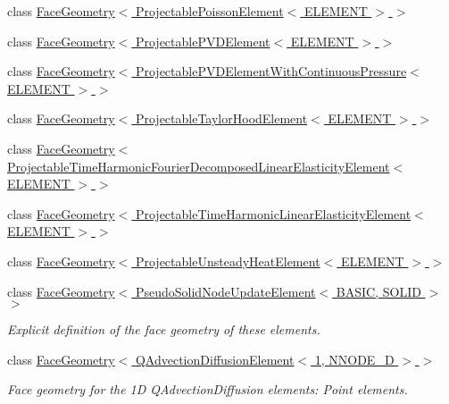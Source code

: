 \begin{DoxyCompactItemize}
\item 
class \hyperlink{classoomph_1_1FaceGeometry_3_01ProjectablePoissonElement_3_01ELEMENT_01_4_01_4}{Face\+Geometry$<$ Projectable\+Poisson\+Element$<$ E\+L\+E\+M\+E\+N\+T $>$ $>$}
\item 
class \hyperlink{classoomph_1_1FaceGeometry_3_01ProjectablePVDElement_3_01ELEMENT_01_4_01_4}{Face\+Geometry$<$ Projectable\+P\+V\+D\+Element$<$ E\+L\+E\+M\+E\+N\+T $>$ $>$}
\item 
class \hyperlink{classoomph_1_1FaceGeometry_3_01ProjectablePVDElementWithContinuousPressure_3_01ELEMENT_01_4_01_4}{Face\+Geometry$<$ Projectable\+P\+V\+D\+Element\+With\+Continuous\+Pressure$<$ E\+L\+E\+M\+E\+N\+T $>$ $>$}
\item 
class \hyperlink{classoomph_1_1FaceGeometry_3_01ProjectableTaylorHoodElement_3_01ELEMENT_01_4_01_4}{Face\+Geometry$<$ Projectable\+Taylor\+Hood\+Element$<$ E\+L\+E\+M\+E\+N\+T $>$ $>$}
\item 
class \hyperlink{classoomph_1_1FaceGeometry_3_01ProjectableTimeHarmonicFourierDecomposedLinearElasticityElement_3_01ELEMENT_01_4_01_4}{Face\+Geometry$<$ Projectable\+Time\+Harmonic\+Fourier\+Decomposed\+Linear\+Elasticity\+Element$<$ E\+L\+E\+M\+E\+N\+T $>$ $>$}
\item 
class \hyperlink{classoomph_1_1FaceGeometry_3_01ProjectableTimeHarmonicLinearElasticityElement_3_01ELEMENT_01_4_01_4}{Face\+Geometry$<$ Projectable\+Time\+Harmonic\+Linear\+Elasticity\+Element$<$ E\+L\+E\+M\+E\+N\+T $>$ $>$}
\item 
class \hyperlink{classoomph_1_1FaceGeometry_3_01ProjectableUnsteadyHeatElement_3_01ELEMENT_01_4_01_4}{Face\+Geometry$<$ Projectable\+Unsteady\+Heat\+Element$<$ E\+L\+E\+M\+E\+N\+T $>$ $>$}
\item 
class \hyperlink{classoomph_1_1FaceGeometry_3_01PseudoSolidNodeUpdateElement_3_01BASIC_00_01SOLID_01_4_01_4}{Face\+Geometry$<$ Pseudo\+Solid\+Node\+Update\+Element$<$ B\+A\+S\+I\+C, S\+O\+L\+I\+D $>$ $>$}
\begin{DoxyCompactList}\small\item\em Explicit definition of the face geometry of these elements. \end{DoxyCompactList}\item 
class \hyperlink{classoomph_1_1FaceGeometry_3_01QAdvectionDiffusionElement_3_011_00_01NNODE__1D_01_4_01_4}{Face\+Geometry$<$ Q\+Advection\+Diffusion\+Element$<$ 1, N\+N\+O\+D\+E\+\_\+D $>$ $>$}
\begin{DoxyCompactList}\small\item\em Face geometry for the 1D Q\+Advection\+Diffusion elements\+: Point elements. \end{DoxyCompactList}\item 

\end{DoxyCompactItemize}
